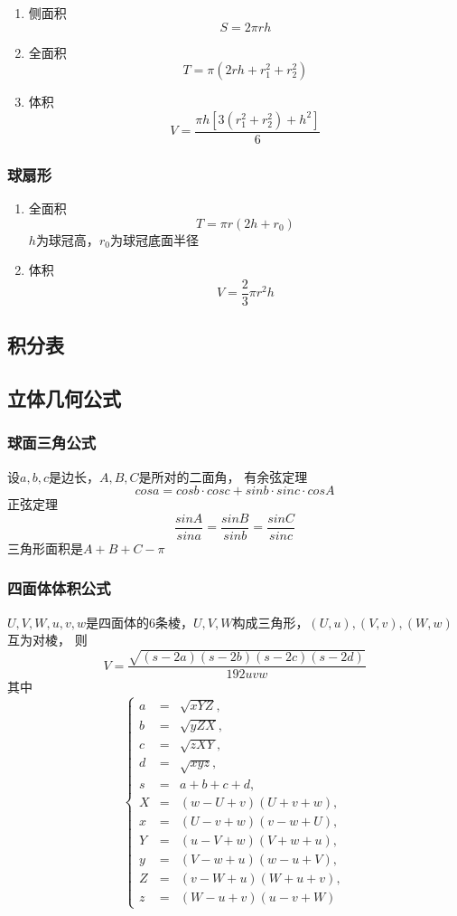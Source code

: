 \documentclass[a4paper]{ctexart}
\begin{document}
\begin{enumerate}
	\item 侧面积
	$$S=2\pi rh$$
	\item 全面积
	$$T=\pi(2rh+r_1^2+r_2^2)$$
	\item 体积
	$$V=\frac{\pi h[3(r_1^2+r_2^2)+h^2]}{6}$$
\end{enumerate}

\subsubsection{球扇形}

\begin{enumerate}
	\item 全面积
	$$T=\pi r(2h+r_0)$$
	$h$为球冠高，$r_0$为球冠底面半径
	\item 体积
	$$V=\frac{2}{3}\pi r^2h$$
\end{enumerate}

\subsection{积分表}


\subsection{立体几何公式}

\subsubsection{球面三角公式}

设$a, b, c$是边长，$A, B, C$是所对的二面角，
有余弦定理$$cos a = cos b \cdot cos c + sin b \cdot sin c \cdot cos A$$
正弦定理$$\frac{sin A}{sin a} = \frac{sin B}{sin b} = \frac{sin C}{sin c}$$
三角形面积是$A + B + C - \pi$

\subsubsection{四面体体积公式}

$U, V, W, u, v, w$是四面体的$6$条棱，$U, V, W$构成三角形，$(U, u), (V, v), (W, w)$互为对棱，
则$$V = \frac{\sqrt{(s - 2a)(s - 2b)(s - 2c)(s - 2d)}}{192 uvw}$$
其中$$\left\{\begin{array}{lll}
a & = & \sqrt{xYZ}, \\
b & = & \sqrt{yZX}, \\
c & = & \sqrt{zXY}, \\
d & = & \sqrt{xyz}, \\
s & = & a + b + c + d, \\
X & = & (w - U + v)(U + v + w), \\
x & = & (U - v + w)(v - w + U), \\
Y & = & (u - V + w)(V + w + u), \\
y & = & (V - w + u)(w - u + V), \\
Z & = & (v - W + u)(W + u + v), \\
z & = & (W - u + v)(u - v + W)
\end{array}\right.$$
\end{document}
